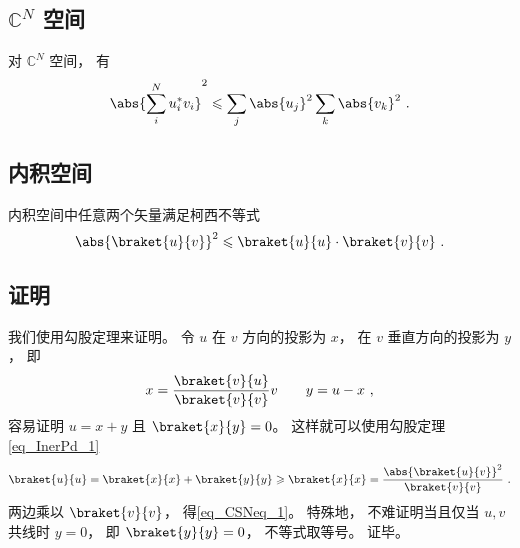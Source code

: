 
\begin{issues}
\issueDraft
\end{issues}


\subsection{$\mathbb C^N$ 空间}
对 $\mathbb C^N$ 空间， 有
\begin{equation}
\abs{\sum_i^N u_i^* v_i}^2 \leqslant \sum_j \abs{u_j}^2 \sum_k \abs{v_k}^2~.
\end{equation}

\subsection{内积空间}
内积空间中任意两个矢量满足柯西不等式
\begin{equation}\label{eq_CSNeq_1}
\abs{\braket{u}{v}}^2 \leqslant \braket{u}{u} \cdot \braket{v}{v}~.
\end{equation}

\subsection{证明}
我们使用勾股定理来证明。 令 $u$ 在 $v$ 方向的投影为 $x$， 在 $v$ 垂直方向的投影为 $y$， 即
\begin{equation}
x = \frac{\braket{v}{u}}{\braket{v}{v}} v \qquad y = u - x~,
\end{equation}
容易证明 $u = x + y$ 且 $\braket{x}{y} = 0$。 这样就可以使用勾股定理\autoref{eq_InerPd_1}~
\begin{equation}
\braket{u}{u} = \braket{x}{x} + \braket{y}{y} \geqslant \braket{x}{x} = \frac{\abs{\braket{u}{v}}^2}{\braket{v}{v}}~.
\end{equation}
两边乘以 $\braket{v}{v}$， 得\autoref{eq_CSNeq_1}。 特殊地， 不难证明当且仅当 $u, v$ 共线时 $y = 0$， 即 $\braket{y}{y} = 0$， 不等式取等号。 证毕。
